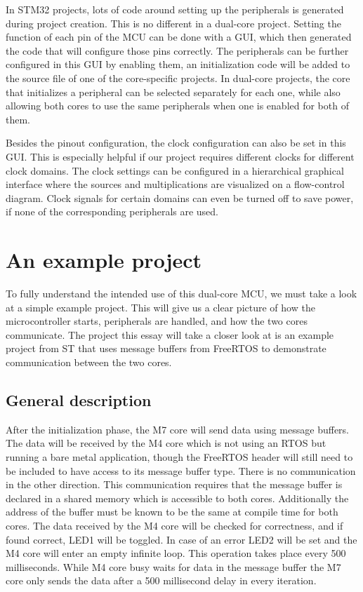 In STM32 projects, lots of code around setting up the peripherals is generated during project creation. This is no different in a dual-core project. Setting the function of each pin of the MCU can be done with a GUI, which then generated the code that will configure those pins correctly. The peripherals can be further configured in this GUI by enabling them, an initialization code will be added to the  source file of  one of the core-specific projects. In dual-core projects, the core that initializes a peripheral can be selected separately for each one, while also allowing both cores to use the same peripherals when one is enabled for both of them.

Besides the pinout configuration, the clock configuration can also be set in this GUI. This is especially helpful if our project requires different clocks for different clock domains. The clock settings can be configured in a hierarchical graphical interface where the sources and multiplications are visualized on a flow-control diagram. Clock signals for certain domains can even be turned off to save power, if none of the corresponding peripherals are used.

\section{An example project}

To fully understand the intended use of this dual-core MCU, we must take a look at a simple example project. This will give us a clear picture of how the microcontroller starts, peripherals are handled, and how the two cores communicate. The project this essay will take a closer look at is an example project from ST that uses message buffers from FreeRTOS to demonstrate communication between the two cores. \cite{CDemo}

\subsection{General description}

After the initialization phase, the M7 core will send data using message buffers. The data will be received by the M4 core which is not using an RTOS but running a bare metal application, though the FreeRTOS header will still need to be included to have access to its message buffer type. There is no communication in the other direction. This communication requires that the message buffer is declared in a shared memory which is accessible to both cores. Additionally the address of the buffer must be known to be the same at compile time for both cores. The data received by the M4 core will be checked for correctness, and if found correct, LED1 will be toggled. In case of an error LED2 will be set and the M4 core will enter an empty infinite loop. This operation takes place every 500 milliseconds. While M4 core busy waits for data in the message buffer the M7 core only sends the data after a 500 millisecond delay in every iteration.

